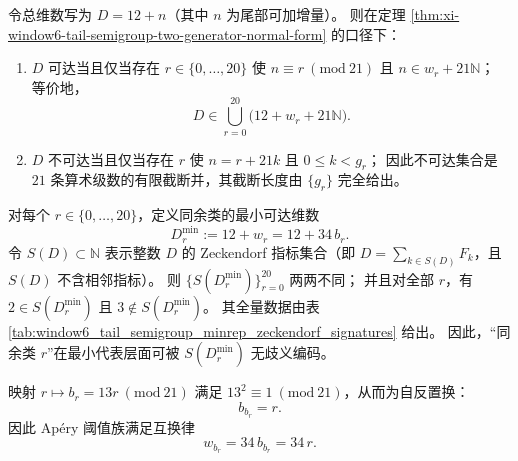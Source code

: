 

\begin{proposition}[维数可达集合的有限截断同余并完全刻画]\label{prop:xi-window6-dimension-reachability-congruence-union}
令总维数写为 \(D=12+n\)（其中 \(n\) 为尾部可加增量）。
则在定理 \ref{thm:xi-window6-tail-semigroup-two-generator-normal-form} 的口径下：
\begin{enumerate}
  \item \(D\) 可达当且仅当存在 \(r\in\{0,\dots,20\}\) 使 \(n\equiv r\ (\mathrm{mod}\ 21)\) 且 \(n\in w_r+21\mathbb N\)；
  等价地，
  \[
  D\in\bigcup_{r=0}^{20}\bigl(12+w_r+21\mathbb N\bigr).
  \]
  \item \(D\) 不可达当且仅当存在 \(r\) 使 \(n=r+21k\) 且 \(0\le k<g_r\)；
  因此不可达集合是 \(21\) 条算术级数的有限截断并，其截断长度由 \(\{g_r\}\) 完全给出。
\end{enumerate}
\end{proposition}

\begin{proposition}\label{prop:xi-window6-minrep-zeckendorf-signature-injection}
对每个 \(r\in\{0,\dots,20\}\)，定义同余类的最小可达维数
\[
D_r^{\min}:=12+w_r=12+34\,b_r.
\]
令 \(S(D)\subset\mathbb N\) 表示整数 \(D\) 的 Zeckendorf 指标集合（即 \(D=\sum_{k\in S(D)}F_k\)，且 \(S(D)\) 不含相邻指标）。
则 \(\{S(D_r^{\min})\}_{r=0}^{20}\) 两两不同；
并且对全部 \(r\)，有 \(2\in S(D_r^{\min})\) 且 \(3\notin S(D_r^{\min})\)。
其全量数据由表 \ref{tab:window6_tail_semigroup_minrep_zeckendorf_signatures} 给出。
因此，“同余类 \(r\)”在最小代表层面可被 \(S(D_r^{\min})\) 无歧义编码。
\end{proposition}



\begin{proposition}\label{prop:xi-window6-congruence-involution}
映射 \(r\mapsto b_r=13r\ (\mathrm{mod}\ 21)\) 满足 \(13^2\equiv 1\ (\mathrm{mod}\ 21)\)，从而为自反置换：
\[
b_{b_r}=r.
\]
因此 Ap\'ery 阈值族满足互换律
\[
w_{b_r}=34\,b_{b_r}=34\,r.
\]
\end{proposition}

